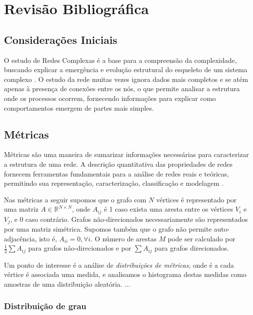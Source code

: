 \chapter{Revisão Bibliográfica}

\section{Considerações Iniciais}

O estudo de Redes Complexas é a base para a compreensão da complexidade, buscando explicar a emergência e 
evolução estrutural do esqueleto de um sistema complexo \cite{barabasi2007architecture}. O estudo da rede
muitas vezes ignora dados mais completos e se atém apenas à presença de conexões entre os nós, o que permite
analisar a estrutura onde os processos ocorrem, fornecendo informações para explicar como comportamentos
emergem de partes mais simples.

\section{Métricas}

Métricas são uma maneira de sumarizar informações necessárias para caracterizar a estrutura de uma rede.
A descrição quantitativa das propriedades de redes fornecem ferramentas fundamentais para a análise de
redes reais e teóricas, permitindo sua representação, caracterização, classificação e modelagem 
\cite{costa2007characterization}.

Nas métricas a seguir supomos que o grafo com $N$ vértices é representado por uma matriz $A \in \mathbb{R}^{N \times N}$, 
onde $A_{ij}$ é 1 caso exista uma aresta entre os vértices $V_i$ e $V_j$, e 0 caso contrário. Grafos não-direcionados 
necessariamente são representados por uma matriz simétrica. Supomos também que o grafo não permite auto-adjacência, isto é, 
$A_{ii} = 0, \forall i$. O número de arestas $M$ pode ser calculado por $\frac{1}{2} \sum A_{ij}$ para grafos 
não-direcionados e por $\sum A_{ij}$ para grafos direcionados. 

Um ponto de interesse é a análise de \emph{distribuições de métricas}, onde
é a cada vértice é associada uma 
medida, e analisamos o histograma destas medidas como amostras de uma distribuição aleatória. ...

\subsection{Distribuição de grau}

